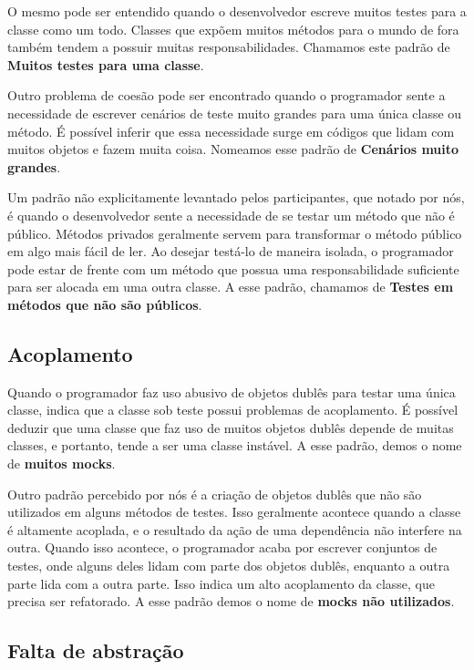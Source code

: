 O mesmo pode ser entendido quando o desenvolvedor escreve muitos testes para a 
classe como um todo. Classes que expõem muitos métodos para o mundo de fora
também tendem a possuir muitas responsabilidades. Chamamos este padrão
de \textbf{Muitos testes para uma classe}.

Outro problema de coesão pode ser encontrado quando o programador
sente a necessidade de escrever cenários de teste muito grandes para uma
única classe ou método. É possível inferir que essa necessidade surge 
em códigos que lidam com muitos objetos e fazem muita coisa. Nomeamos
esse padrão de \textbf{Cenários muito grandes}.

Um padrão não explicitamente levantado pelos participantes, que notado
por nós, é quando o desenvolvedor sente a necessidade de se testar
um método que não é público. Métodos privados geralmente servem para 
transformar o método público em algo mais fácil de ler. Ao desejar
testá-lo de maneira isolada, o programador pode estar de frente com
um método que possua uma responsabilidade suficiente para ser
alocada em uma outra classe. A esse padrão, chamamos de 
\textbf{Testes em métodos que não são públicos}.

\subsection{Acoplamento}

Quando o programador faz uso abusivo de objetos dublês para testar uma
única classe, indica que a classe sob teste possui problemas
de acoplamento. É possível deduzir que uma classe que faz uso de muitos
objetos dublês depende de muitas classes, e portanto, tende a ser
uma classe instável. A esse padrão, demos o nome de \textbf{muitos mocks}.

Outro padrão percebido por nós é a criação de objetos dublês que não
são utilizados em alguns métodos de testes. Isso geralmente acontece quando
a classe é altamente acoplada, e o resultado da ação de uma dependência não
interfere na outra. Quando isso acontece, o programador acaba por escrever
conjuntos de testes, onde alguns deles lidam com parte dos objetos dublês,
enquanto a outra parte lida com a outra parte. Isso indica um alto acoplamento 
da classe, que precisa ser refatorado. A esse padrão demos o nome de
\textbf{mocks não utilizados}.


\subsection{Falta de abstração}


